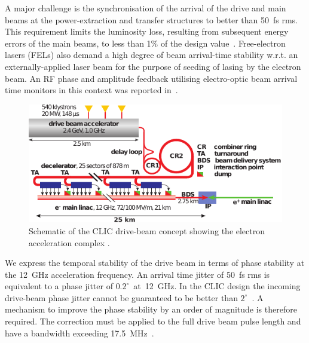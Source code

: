 \documentclass[%
 reprint,
 superscriptaddress,
 amsmath,
 amssymb,
 prl,
]{revtex4-1}
\begin{document}

A major challenge is the synchronisation of the arrival of the drive and main 
beams at the power-extraction and transfer structures to better than 50~fs rms. 
This requirement limits the luminosity loss, resulting from subsequent 
energy errors of the main beams, to less than 1\% of the design 
value~\cite{clicLumEq}. Free-electron lasers (FELs) also demand a high degree 
of beam arrival-time stability w.r.t. an externally-applied laser beam for the 
purpose of seeding of lasing by the electron beam. An RF phase and amplitude 
feedback utilising electro-optic beam arrival time monitors in this context was 
reported in~\cite{flashPRL}.

\begin{figure}
	\includegraphics[width=\columnwidth]{figs/clicLayout}
	\caption{\label{fig:CLICLayout} Schematic of the CLIC drive-beam 
	concept showing the electron acceleration complex \cite{CLIC-staging}.
	}
\end{figure}

We express the temporal stability of the drive beam in terms of phase 
stability at the 12~GHz acceleration frequency. An arrival time jitter of 50~fs 
rms is equivalent to a phase jitter of \(0.2^\circ\)~at~12~GHz.
In the CLIC design the incoming drive-beam phase jitter 
cannot be guaranteed to be better than \(2^\circ\)~\cite{CLICCDR}. A mechanism 
to improve the phase stability by an order of magnitude is 
therefore required. The correction must be applied to the full drive beam pulse 
length and have a bandwidth exceeding 17.5~MHz~\cite{Gerber2015}. 
\end{document}
